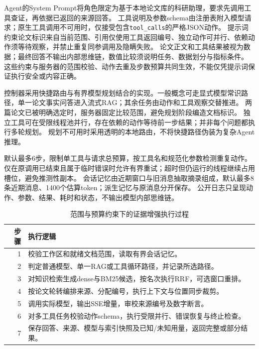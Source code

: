 \documentclass[UTF8,a4paper,zihao=-4,fontset=fandol]{ctexart}
\newcommand{\ReportTableStyle}{\fontsize{10.5}{14}\selectfont\setstretch{1.15}%
 \setlength{\tabcolsep}{4.5pt}\renewcommand{\arraystretch}{1.28}}
\begin{document}
Agent的System Prompt将角色限定为基于本地论文库的科研助理，要求先调用工具查证，再依据已返回的来源回答。
工具说明及参数schema由注册表附入模型请求；原生工具调用不可用时，仅接受包含\texttt{tool\_calls}的严格JSON动作。
提示词约束论文标识来自当前范围、引用仅使用工具返回编号、独立动作可并行、依赖动作须等待观察，并禁止重复同参调用及隐瞒失败。
论文正文和工具结果被视为数据；最终回答不输出内部思维链，数值比较须说明任务、数据划分与指标条件。
这些约束与服务器的范围校验、动作去重及步数预算共同生效，不能仅凭提示词保证执行安全或内容正确。

控制器采用快捷路由与有界模型规划结合的实现。一般概念可走显式模型常识路径，单一论文事实问答进入流式RAG；其余任务由动作和工具观察交替推进。
两篇论文已被明确选定时，服务器固定比较范围，避免规划阶段编造文档标识。
独立工具可在受限线程池并行，存在依赖的动作等待前一步结果；并非每个问题都执行多轮规划。
规划不可用时采用透明的本地路由，不将快捷路径伪装为复杂Agent推理。

默认最多6步，限制单工具与请求总预算，按工具名和规范化参数检测重复动作。
仅在原调用已结束且属于临时错误时允许有界重试；超时但仍运行的线程继续占用槽位，避免推测性副本。
会话记忆由近期窗口与旧消息抽取摘录组成，默认最多8条近期消息、1400个估算token；派生记忆与原消息分开保存。
公开日志只呈现动作、参数、结果、耗时和状态，不输出模型内部思维链。

\begin{table}[htbp]\centering\caption{范围与预算约束下的证据增强执行过程}\label{tab:algorithm}\ReportTableStyle
\begin{tabularx}{\linewidth}{@{}rY@{}}\toprule{}
\textbf{步骤} & \textbf{执行逻辑} \\  & 校验工作区和就绪文档范围，读取有界会话记忆。\\
2 & 判定普通模型、单一RAG或工具循环路径，并记录所选路径。\\
3 & 对知识检索生成dense与BM25候选，按名次执行RRF，可选窗口重排。\\
4 & 按论文轮转编排来源、分配编号，执行上下文与位置同步裁剪。\\
5 & 调用实际模型，输出SSE增量，审校来源编号及数字断言。\\
6 & 对多工具任务校验动作schema，执行受限并行、错误恢复与终止检查。\\
7 & 保存回答、来源、模型与索引快照及已知/未知用量，返回完整或部分结果。\\\bottomrule\end{tabularx}\end{table}
\end{document}
